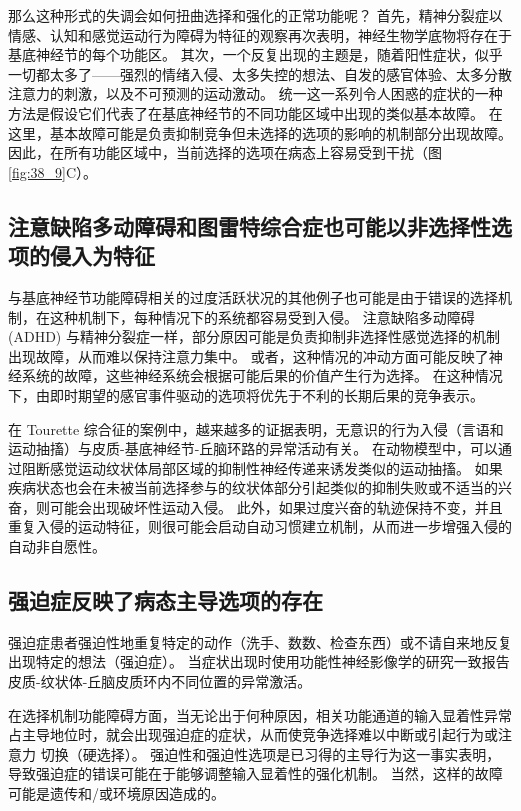 那么这种形式的失调会如何扭曲选择和强化的正常功能呢？ 首先，精神分裂症以情感、认知和感觉运动行为障碍为特征的观察再次表明，神经生物学底物将存在于基底神经节的每个功能区。 其次，一个反复出现的主题是，随着阳性症状，似乎一切都太多了——强烈的情绪入侵、太多失控的想法、自发的感官体验、太多分散注意力的刺激，以及不可预测的运动激动。 统一这一系列令人困惑的症状的一种方法是假设它们代表了在基底神经节的不同功能区域中出现的类似基本故障。 在这里，基本故障可能是负责抑制竞争但未选择的选项的影响的机制部分出现故障。 因此，在所有功能区域中，当前选择的选项在病态上容易受到干扰（图 \ref{fig:38_9}C）。



\subsection{注意缺陷多动障碍和图雷特综合症也可能以非选择性选项的侵入为特征}

与基底神经节功能障碍相关的过度活跃状况的其他例子也可能是由于错误的选择机制，在这种机制下，每种情况下的系统都容易受到入侵。 注意缺陷多动障碍 (ADHD) 与精神分裂症一样，部分原因可能是负责抑制非选择性感觉选择的机制出现故障，从而难以保持注意力集中。 或者，这种情况的冲动方面可能反映了神经系统的故障，这些神经系统会根据可能后果的价值产生行为选择。 在这种情况下，由即时期望的感官事件驱动的选项将优先于不利的长期后果的竞争表示。

在 Tourette 综合征的案例中，越来越多的证据表明，无意识的行为入侵（言语和运动抽搐）与皮质-基底神经节-丘脑环路的异常活动有关。 在动物模型中，可以通过阻断感觉运动纹状体局部区域的抑制性神经传递来诱发类似的运动抽搐。 如果疾病状态也会在未被当前选择参与的纹状体部分引起类似的抑制失败或不适当的兴奋，则可能会出现破坏性运动入侵。 此外，如果过度兴奋的轨迹保持不变，并且重复入侵的运动特征，则很可能会启动自动习惯建立机制，从而进一步增强入侵的自动非自愿性。



\subsection{强迫症反映了病态主导选项的存在}
强迫症患者强迫性地重复特定的动作（洗手、数数、检查东西）或不请自来地反复出现特定的想法（强迫症）。 当症状出现时使用功能性神经影像学的研究一致报告皮质-纹状体-丘脑皮质环内不同位置的异常激活。

在选择机制功能障碍方面，当无论出于何种原因，相关功能通道的输入显着性异常占主导地位时，就会出现强迫症的症状，从而使竞争选择难以中断或引起行为或注意力 切换（硬选择）。 强迫性和强迫性选项是已习得的主导行为这一事实表明，导致强迫症的错误可能在于能够调整输入显着性的强化机制。 当然，这样的故障可能是遗传和/或环境原因造成的。

